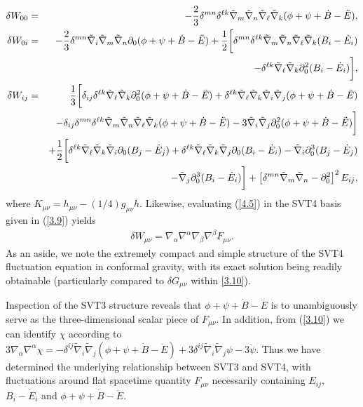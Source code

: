 \begin{eqnarray}
\delta W_{00}  &=& -\frac{2}{3} \delta^{mn}\delta^{\ell k}\tilde{\nabla}_m\tilde{\nabla}_n\tilde{\nabla}_{\ell}\tilde{\nabla}_k (\phi + \psi +\dot{B}-\ddot{E}),
\nonumber\\	
\delta W_{0i} &=&  -\frac{2}{3} \delta^{mn}\tilde{\nabla}_i\tilde{\nabla}_m\tilde{\nabla}_n\partial_0(\phi +\psi +\dot{B}-\ddot{E})
+\frac{1}{2}\bigg[\delta^{mn}\delta^{\ell k}\tilde{\nabla}_m\tilde{\nabla}_n\tilde{\nabla}_{\ell}\tilde{\nabla}_k(B_i - \dot{E}_i)
\nonumber\\
&& -  \delta^{\ell k}\tilde{\nabla}_{\ell}\tilde{\nabla}_k \partial_0^2(B_i - \dot{E}_i)\bigg],
\nonumber\\	
\delta W_{ij}  &=& \frac{1}{3}\bigg{[} \delta_{ij}\delta^{\ell k}\tilde{\nabla}_{\ell}\tilde{\nabla}_k  \partial_0^2(\phi+ \psi+\dot{B}-\ddot{E}) + \delta^{\ell k}\tilde{\nabla}_{\ell}\tilde{\nabla}_k \tilde{\nabla}_i\tilde{\nabla}_j (\phi + \psi +\dot{B}-\ddot{E}) 
\nonumber\\
&&- \delta_{ij} \delta^{mn}\delta^{\ell k}\tilde{\nabla}_m\tilde{\nabla}_n\tilde{\nabla}_{\ell}\tilde{\nabla}_k(\phi + \psi +\dot{B}-\ddot{E}) -3\tilde{\nabla}_i\tilde{\nabla}_j \partial_0^2(\phi + \psi +\dot{B}-\ddot{E})\bigg{] }
\nonumber\\
&&+\frac{1}{2}\bigg[ \delta^{\ell k}\tilde{\nabla}_{\ell}\tilde{\nabla}_k \tilde{\nabla}_i   \partial_0(B_j - \dot{E}_j)+ \delta^{\ell k}\tilde{\nabla}_{\ell}\tilde{\nabla}_k \tilde{\nabla}_j \partial_0(B_i - \dot{E}_i) - \tilde{\nabla}_i\partial_0^3(B_j - \dot{E}_j)
\nonumber\\
&&-\tilde{\nabla}_j\partial_0^3(B_i - \dot{E}_i)\bigg] +\left[\delta^{mn}\tilde{\nabla}_m\tilde{\nabla}_n-\partial_0^2\right]^2E_{ij},
\label{4.6}
\end{eqnarray}
%
where $K_{\mu\nu}=h_{\mu\nu}-(1/4)g_{\mu\nu}h$. Likewise,  evaluating (\ref{4.5}) in the SVT4 basis given in (\ref{3.9}) yields 
%
\begin{eqnarray}
\delta W_{\mu\nu}=\nabla_{\alpha}\nabla^{\alpha}\nabla_{\beta}\nabla^{\beta}F_{\mu\nu}.
\label{4.7}
\end{eqnarray}
%
As an aside, we note the extremely compact and simple structure of the SVT4 fluctuation equation in conformal gravity, with its exact solution being readily obtainable (particularly compared to $\delta G_{\mu\nu}$ within \eqref{3.10}).

Inspection of the SVT3 structure reveals that $\phi + \psi +\dot{B}-\ddot{E}$ is to unambiguously serve as the three-dimensional scalar piece of $F_{\mu\nu}$. In addition, from (\ref{3.10}) we can identify $\chi$ according to $3\nabla_{\alpha}\nabla^{\alpha}\chi=-\delta^{ij}\tilde{\nabla}_i\tilde{\nabla}_j(\phi  +\psi +\dot{B}-\ddot{E})+3\delta^{ij}\tilde{\nabla}_{i}\tilde{\nabla}_{j}\psi-3\ddot{\psi}$. Thus we have determined the underlying relationship between SVT3 and SVT4, with fluctuations around flat spacetime quantity $F_{\mu\nu}$ necessarily containing $E_{ij}$, $B_i-\dot{E}_i$ and $\phi + \psi +\dot{B}-\ddot{E}$. 

